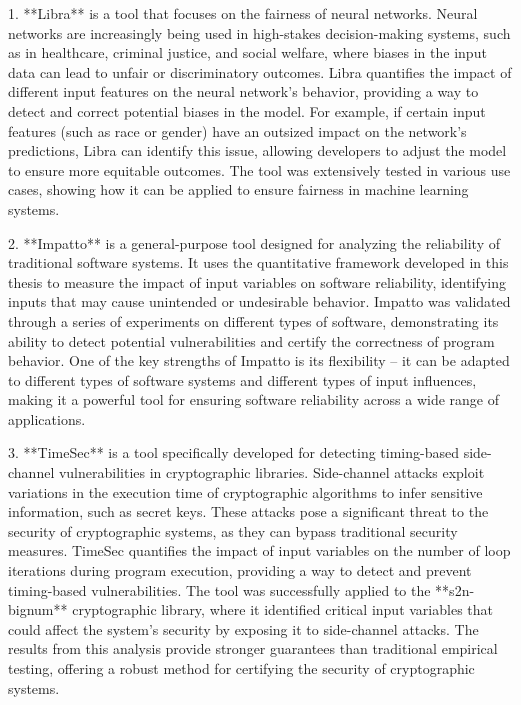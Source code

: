 {1. **Libra** is a tool that focuses on the fairness of neural networks. Neural networks are increasingly being used in high-stakes decision-making systems, such as in healthcare, criminal justice, and social welfare, where biases in the input data can lead to unfair or discriminatory outcomes. Libra quantifies the impact of different input features on the neural network’s behavior, providing a way to detect and correct potential biases in the model. For example, if certain input features (such as race or gender) have an outsized impact on the network’s predictions, Libra can identify this issue, allowing developers to adjust the model to ensure more equitable outcomes. The tool was extensively tested in various use cases, showing how it can be applied to ensure fairness in machine learning systems.

2. **Impatto** is a general-purpose tool designed for analyzing the reliability of traditional software systems. It uses the quantitative framework developed in this thesis to measure the impact of input variables on software reliability, identifying inputs that may cause unintended or undesirable behavior. Impatto was validated through a series of experiments on different types of software, demonstrating its ability to detect potential vulnerabilities and certify the correctness of program behavior. One of the key strengths of Impatto is its flexibility -- it can be adapted to different types of software systems and different types of input influences, making it a powerful tool for ensuring software reliability across a wide range of applications.

3. **TimeSec** is a tool specifically developed for detecting timing-based side-channel vulnerabilities in cryptographic libraries. Side-channel attacks exploit variations in the execution time of cryptographic algorithms to infer sensitive information, such as secret keys. These attacks pose a significant threat to the security of cryptographic systems, as they can bypass traditional security measures. TimeSec quantifies the impact of input variables on the number of loop iterations during program execution, providing a way to detect and prevent timing-based vulnerabilities. The tool was successfully applied to the **s2n-bignum** cryptographic library, where it identified critical input variables that could affect the system's security by exposing it to side-channel attacks. The results from this analysis provide stronger guarantees than traditional empirical testing, offering a robust method for certifying the security of cryptographic systems.

}
